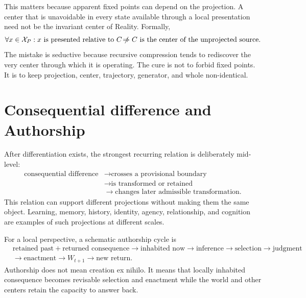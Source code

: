 \documentclass[11pt]{article}
\newcommand{\nrightarrowbyitself}{\mathrel{\not\!\Rightarrow}}
\begin{document}
This matters because apparent fixed points can depend on the projection. A center that is unavoidable in every state available through a local presentation need not be the invariant center of Reality. Formally,
\begin{equation}
\forall x\in\mathcal{X}_{P}: x\ \text{is presented relative to }C
\nrightarrowbyitself
C\ \text{is the center of the unprojected source}.
\end{equation}
The mistake is seductive because recursive compression tends to rediscover the very center through which it is operating. The cure is not to forbid fixed points. It is to keep projection, center, trajectory, generator, and whole non-identical.

\section{Consequential difference and Authorship}

After differentiation exists, the strongest recurring relation is deliberately mid-level:
\begin{equation}
\begin{aligned}
\text{consequential difference}
&\rightarrow\text{crosses a provisional boundary}\\
&\rightarrow\text{is transformed or retained}\\
&\rightarrow\text{changes later admissible transformation}.
\end{aligned}
\end{equation}
This relation can support different projections without making them the same object. Learning, memory, history, identity, agency, relationship, and cognition are examples of such projections at different scales.

For a local perspective, a schematic authorship cycle is
\begin{equation}
\begin{aligned}
&\text{retained past}+\text{returned consequence}
\rightarrow \text{inhabited now}
\rightarrow \text{inference}\rightarrow\text{selection}\rightarrow\text{judgment}\\
&\rightarrow\text{enactment}\rightarrow W_{t+1}\rightarrow\text{new return}.
\end{aligned}
\end{equation}
Authorship does not mean creation ex nihilo. It means that locally inhabited consequence becomes revisable selection and enactment while the world and other centers retain the capacity to answer back.
\end{document}
